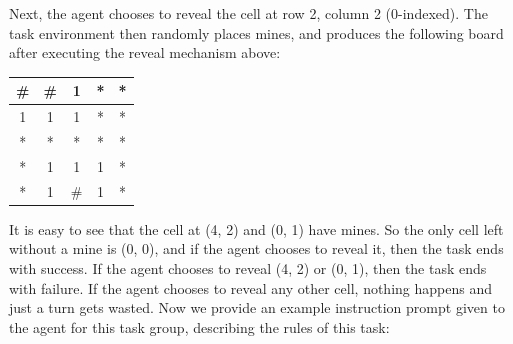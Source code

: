 \documentclass{article}
\theoremstyle{plain}
\theoremstyle{definition}
\theoremstyle{remark}
\begin{document}
Next, the agent chooses to reveal the cell at row 2, column 2 (0-indexed). The task environment then randomly places mines, and produces the following board after executing the reveal mechanism above:
\begin{table}[h]
\centering
\begin{tabular}{|c|c|c|c|c|}
\hline
\# & \# & 1 & * & * \\
\hline
1 & 1 & 1 & * & * \\
\hline
* & * & * & * & * \\
\hline
* & 1 & 1 & 1 & * \\
\hline
* & 1 & \# & 1 & * \\
\hline
\end{tabular}
\end{table}
It is easy to see that the cell at (4, 2) and (0, 1) have mines.  So the only cell left without a mine is (0, 0), and if the agent chooses to reveal it, then the task ends with success. If the agent chooses to reveal (4, 2) or (0, 1), then the task ends with failure. If the agent chooses to reveal any other cell, nothing happens and just a turn gets wasted.
\newpage
Now we provide an example instruction prompt given to the agent for this task group, describing the rules of this task:
\end{document}
